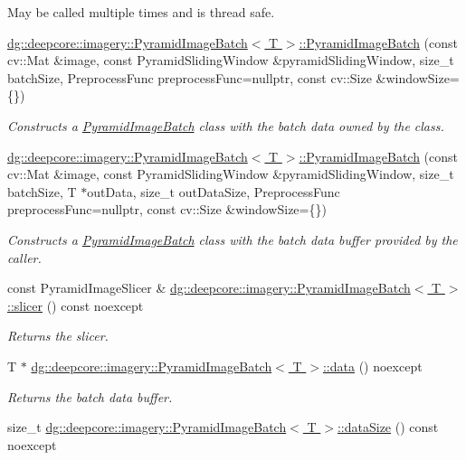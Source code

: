 \begin{DoxyCompactItemize}
\begin{DoxyCompactList}
May be called multiple times and is thread safe. \end{DoxyCompactList}\item 
\hyperlink{group___imagery_module_ga5779bf3b610df23758e3f905b03f67ef}{dg\+::deepcore\+::imagery\+::\+Pyramid\+Image\+Batch$<$ T $>$\+::\+Pyramid\+Image\+Batch} (const cv\+::\+Mat \&image, const Pyramid\+Sliding\+Window \&pyramid\+Sliding\+Window, size\+\_\+t batch\+Size, Preprocess\+Func preprocess\+Func=nullptr, const cv\+::\+Size \&window\+Size=\{\})
\begin{DoxyCompactList}\small\item\em Constructs a \hyperlink{classdg_1_1deepcore_1_1imagery_1_1_pyramid_image_batch}{Pyramid\+Image\+Batch} class with the batch data owned by the class. \end{DoxyCompactList}\item 
\hyperlink{group___imagery_module_gab801036420ec3dd50de9d5c5e3ec4024}{dg\+::deepcore\+::imagery\+::\+Pyramid\+Image\+Batch$<$ T $>$\+::\+Pyramid\+Image\+Batch} (const cv\+::\+Mat \&image, const Pyramid\+Sliding\+Window \&pyramid\+Sliding\+Window, size\+\_\+t batch\+Size, T $\ast$out\+Data, size\+\_\+t out\+Data\+Size, Preprocess\+Func preprocess\+Func=nullptr, const cv\+::\+Size \&window\+Size=\{\})
\begin{DoxyCompactList}\small\item\em Constructs a \hyperlink{classdg_1_1deepcore_1_1imagery_1_1_pyramid_image_batch}{Pyramid\+Image\+Batch} class with the batch data buffer provided by the caller. \end{DoxyCompactList}\item 
const Pyramid\+Image\+Slicer \& \hyperlink{group___imagery_module_ga8c11e57a0df4dcfabfd28eab4440b3d9}{dg\+::deepcore\+::imagery\+::\+Pyramid\+Image\+Batch$<$ T $>$\+::slicer} () const noexcept
\begin{DoxyCompactList}\small\item\em Returns the slicer. \end{DoxyCompactList}\item 
T $\ast$ \hyperlink{group___imagery_module_ga5ac82c16d79194885581fc6cb07f7f41}{dg\+::deepcore\+::imagery\+::\+Pyramid\+Image\+Batch$<$ T $>$\+::data} () noexcept
\begin{DoxyCompactList}\small\item\em Returns the batch data buffer. \end{DoxyCompactList}\item 
size\+\_\+t \hyperlink{group___imagery_module_gae52827a6e33495ed3b41bc8fa9e956aa}{dg\+::deepcore\+::imagery\+::\+Pyramid\+Image\+Batch$<$ T $>$\+::data\+Size} () const noexcept

\end{DoxyCompactItemize}

